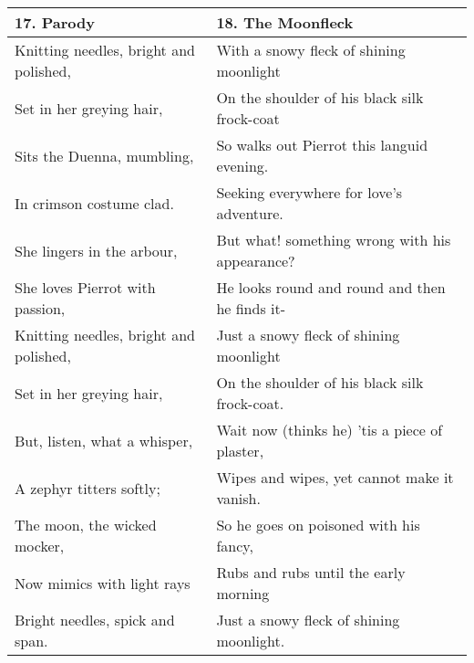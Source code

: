 \begin{table}[h!]
\begin{tabular}{p{8.0cm}|p{8.0cm}}
17. Parody & 18. The Moonfleck \\\hline
Knitting needles, bright and polished, & With a snowy fleck of shining moonlight \\
Set in her greying hair,& On the shoulder of his black silk frock-coat \\
Sits the Duenna, mumbling,& So walks out Pierrot this languid evening. \\
In crimson costume clad. & Seeking everywhere for love's adventure. \\
She lingers in the arbour, & But what! something wrong with his appearance? \\
She loves Pierrot with passion, & He looks round and round and then he finds it- \\
Knitting needles, bright and polished, & Just a snowy fleck of shining moonlight \\
Set in her greying hair, & On the shoulder of his black silk frock-coat. \\
But, listen, what a whisper, & Wait now (thinks he) 'tis a piece of plaster, \\
A zephyr titters softly; & Wipes and wipes, yet cannot make it vanish. \\
The moon, the wicked mocker, & So he goes on poisoned with his fancy, \\
Now mimics with light rays & Rubs and rubs until the early morning \\
Bright needles, spick and span. & Just a snowy fleck of shining moonlight. \\

\end{tabular}
\end{table}


